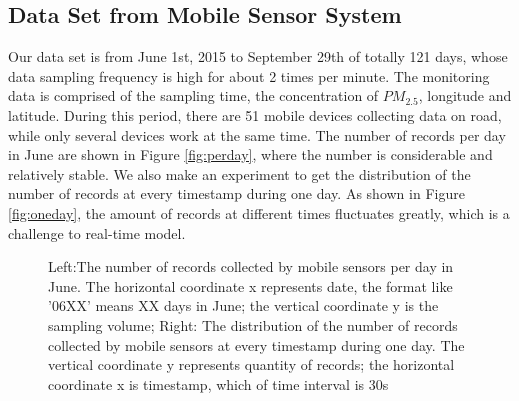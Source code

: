 \documentclass[twoside,leqno,twocolumn]{article}
\begin{document}
\subsection{Data Set from Mobile Sensor System}
Our data set is from June 1st, 2015 to September 29th of totally 121 days, whose data sampling frequency is high for about 2 times per minute. The monitoring data is comprised of the sampling time, the concentration of $PM_{2.5}$, longitude and latitude. During this period, there are 51 mobile devices collecting data on road, while only several devices work at the same time. The number of records per day in June are shown in Figure \ref{fig:perday}, where the number is considerable and relatively stable. We also make an experiment to get the distribution of the number of records at every timestamp during one day. As shown in Figure \ref{fig:oneday}, the amount of records at different times fluctuates greatly, which is a challenge to real-time model.
\begin{figure}[!htb]
\centerline{
}
\caption{\label{fig:recordsPerday}Left:The number of records collected by mobile sensors per day in June. The horizontal coordinate x represents date, the format like '06XX' means XX days in June; the vertical coordinate y is the sampling volume; Right: The distribution of the number of records collected by mobile sensors at every timestamp during one day. The vertical coordinate y represents quantity of records; the horizontal coordinate x is timestamp, which of time interval is 30s}
\end{figure}
\end{document}
